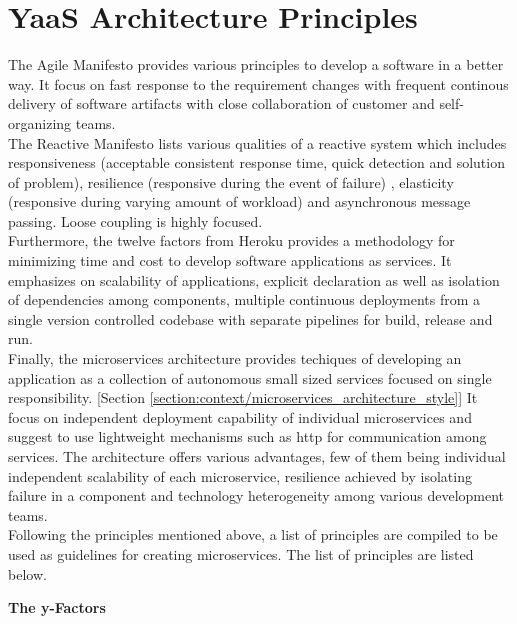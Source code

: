 \section{YaaS Architecture Principles}\label{section:hybris_architecture/YaaS_architecture_principles}
The Agile Manifesto \cite{Beck:2011aa} provides various principles to develop a software in a better way. It focus on fast response to the requirement changes with frequent continous delivery of software artifacts with close collaboration of customer and self-organizing teams.\\
The Reactive Manifesto \cite{Boner:2014aa} lists various qualities of a reactive system which includes responsiveness (acceptable consistent response time, quick detection and solution of problem), resilience (responsive during the event of failure) , elasticity (responsive during varying amount of workload) and asynchronous message passing. Loose coupling is highly focused.\\
Furthermore, the twelve factors from Heroku \cite{Wiggins:2012aa} provides a methodology for minimizing time and cost to develop software applications as services. It emphasizes on scalability of applications, explicit declaration as well as isolation of dependencies among components, multiple continuous deployments from a single version controlled codebase with separate pipelines for build, release and run.\\
Finally, the microservices architecture provides techiques of developing an application as a collection of autonomous small sized services focused on single responsibility. [Section \ref{section:context/microservices_architecture_style}] It focus on independent deployment capability of individual microservices and suggest to use lightweight mechanisms such as http for communication among services. The architecture offers various advantages, few of them being individual independent scalability of each microservice, resilience achieved by isolating failure in a component and technology heterogeneity among various development teams.\cite{Newman:2015aa}
\\
Following the principles mentioned above, a list of principles are compiled to be used as guidelines for creating microservices. \cite{Stubbe:2015aa} The list of principles are listed below.
\\
\begin{shaded}\textbf{The y-Factors}\end{shaded}
\\
